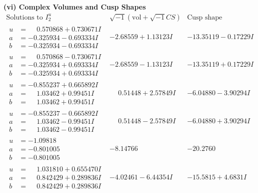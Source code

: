 \documentclass[1p]{elsarticle_modified}
\theoremstyle{definition}
\newcommand{\I}{\sqrt{-1}}
\begin{document}
\newpage\flushleft \textbf{(vi) Complex Volumes and Cusp Shapes}
$$\begin{array}{c|c|c}  
\text{Solutions to }I^u_{2}& \I (\text{vol} + \sqrt{-1}CS) & \text{Cusp shape}\\
 \hline 
\begin{aligned}
u &= \phantom{-}0.570868 + 0.730671 I \\
a &= -0.325934 - 0.693334 I \\
b &= -0.325934 - 0.693334 I\end{aligned}
 & -2.68559 + 1.13123 I & -13.35119 - 0.17229 I \\ \hline\begin{aligned}
u &= \phantom{-}0.570868 - 0.730671 I \\
a &= -0.325934 + 0.693334 I \\
b &= -0.325934 + 0.693334 I\end{aligned}
 & -2.68559 - 1.13123 I & -13.35119 + 0.17229 I \\ \hline\begin{aligned}
u &= -0.855237 + 0.665892 I \\
a &= \phantom{-}1.03462 + 0.99451 I \\
b &= \phantom{-}1.03462 + 0.99451 I\end{aligned}
 & \phantom{-}0.51448 + 2.57849 I & -6.04880 - 3.90294 I \\ \hline\begin{aligned}
u &= -0.855237 - 0.665892 I \\
a &= \phantom{-}1.03462 - 0.99451 I \\
b &= \phantom{-}1.03462 - 0.99451 I\end{aligned}
 & \phantom{-}0.51448 - 2.57849 I & -6.04880 + 3.90294 I \\ \hline\begin{aligned}
u &= -1.09818\phantom{ +0.000000I} \\
a &= -0.801005\phantom{ +0.000000I} \\
b &= -0.801005\phantom{ +0.000000I}\end{aligned}
 & -8.14766\phantom{ +0.000000I} & -20.2760\phantom{ +0.000000I} \\ \hline\begin{aligned}
u &= \phantom{-}1.031810 + 0.655470 I \\
a &= \phantom{-}0.842429 + 0.289836 I \\
b &= \phantom{-}0.842429 + 0.289836 I\end{aligned}
 & -4.02461 - 6.44354 I & -15.5815 + 4.6831 I \\ \hline\begin{aligned}

\end{aligned}
\end{array}$$
\end{document}
